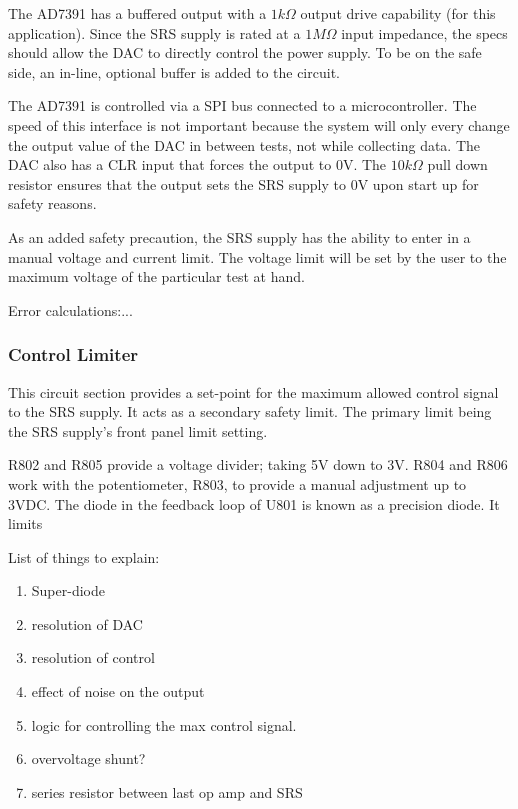 The AD7391 has a buffered output with a $1k\Omega$ output drive capability (for this application). Since the SRS supply is rated at a $1M\Omega$ input impedance, the specs should allow the DAC to directly control the power supply. To be on the safe side, an in-line, optional buffer is added to the circuit.

The AD7391 is controlled via a SPI bus connected to a microcontroller. The speed of this interface is not important because the system will only every change the output value of the DAC in between tests, not while collecting data. The DAC also has a CLR input that forces the output to 0V. The $10k\Omega$ pull down resistor ensures that the output sets the SRS supply to 0V upon start up for safety reasons.

As an added safety precaution, the SRS supply has the ability to enter in a manual voltage and current limit. The voltage limit will be set by the user to the maximum voltage of the particular test at hand.

Error calculations:...



\subsubsection{Control Limiter}

This circuit section provides a set-point for the maximum allowed control signal to the SRS supply. It acts as a secondary safety limit. The primary limit being the SRS supply's front panel limit setting.

R802 and R805 provide a voltage divider; taking 5V down to 3V. R804 and R806 work with the potentiometer, R803, to provide a manual adjustment up to 3VDC. The diode in the feedback loop of U801 is known as a precision diode. \cite[ch5.1]{jungCook} It limits


List of things to explain:
\begin{enumerate}
    \item Super-diode
    \item resolution of DAC
    \item resolution of control
    \item effect of noise on the output
    \item logic for controlling the max control signal.
    \item overvoltage shunt?
    \item series resistor between last op amp and SRS
\end{enumerate}


